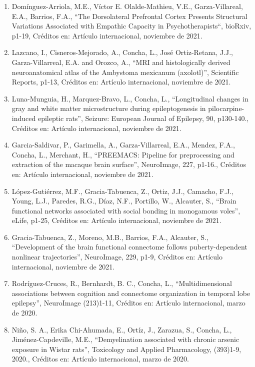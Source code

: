 \documentclass[12pt]{article}
\begin{document}
\begin{enumerate}
\item Domínguez-Arriola, M.E., Víctor E. Olalde-Mathieu, V.E., Garza-Villareal, E.A., Barrios, F.A., “The Dorsolateral Prefrontal 
Cortex Presents Structural Variations Associated with Empathic Capacity in Psychotherapists“, bioRxiv, p1-19, Créditos en: Artículo 
internacional, noviembre de 2021.

\item Lazcano, I., Cisneros-Mejorado, A., Concha, L., José Ortiz-Retana, J.J., Garza-Villarreal, E.A. and Orozco, A., “MRI and 
histologically derived neuroanatomical atlas of the Ambystoma mexicanum (axolotl)”, Scientific Reports, p1-13, Créditos en: Artículo 
internacional, noviembre de 2021.

\item Luna-Munguia, H., Marquez-Bravo, L., Concha, L., “Longitudinal changes in gray and white matter microstructure during 
epileptogenesis in pilocarpine-induced epileptic rats”, Seizure: European Journal of Epilepsy, 90, p130-140., Créditos en: Artículo 
internacional, noviembre de 2021.

\item Garcia-Saldivar, P., Garimella, A., Garza-Villarreal, E.A., Mendez, F.A., Concha, L., Merchant, H., “PREEMACS: Pipeline for 
preprocessing and extraction of the macaque brain surface”, NeuroImage, 227, p1-16., Créditos en: Artículo internacional, noviembre de 
2021.

\item López-Gutiérrez, M.F., Gracia-Tabuenca, Z., Ortiz, J.J., Camacho, F.J., Young, L.J., Paredes, R.G., Díaz, N.F., Portillo, W., 
Alcauter, S., “Brain functional networks associated with social bonding in monogamous voles”, eLife, p1-25, Créditos en: Artículo 
internacional, noviembre de 2021.

\item Gracia-Tabuenca, Z., Moreno, M.B., Barrios, F.A., Alcauter, S., “Development of the brain functional connectome follows 
puberty-dependent nonlinear trajectories”, NeuroImage, 229, p1-9, Créditos en: Artículo internacional, noviembre de 2021.

\item Rodríguez-Cruces, R., Bernhardt, B. C., Concha, L., “Multidimensional associations between cognition and connectome organization 
in 
temporal lobe epilepsy”, NeuroImage (213)1-11, Créditos en: Artículo internacional, marzo de 2020.

\item Niño, S. A., Erika Chi-Ahumada, E., Ortíz, J., Zarazua, S., Concha, L., Jiménez-Capdeville, M.E., “Demyelination associated with 
chronic arsenic exposure in Wistar rats”, Toxicology and Applied Pharmacology, 
(393)1-9, 2020., Créditos en: Artículo internacional, marzo de 2020.


\end{enumerate}
\end{document}
